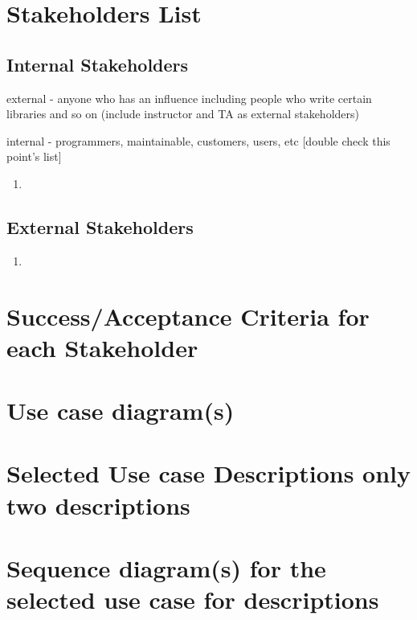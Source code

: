 \documentclass[11pt]{article}
\begin{document}
    \chapter{Stakeholders List}\label{ch:stakeholders-list}


    \section{Internal Stakeholders}\label{sec:internal-stakeholders}

    \item external - anyone who has an influence\; including people who write certain libraries and so on  (include instructor and TA as external stakeholders)
    \item internal - programmers, maintainable, customers, users, etc [double check this point's list]


    \begin{enumerate}
        \item
    \end{enumerate}


    \section{External Stakeholders}\label{sec:external-stakeholders}

    \begin{enumerate}
        \item
    \end{enumerate}


    \chapter{Success/Acceptance Criteria for each Stakeholder}


    \chapter{Use case diagram(s)}


    \chapter{Selected Use case Descriptions {only two descriptions}}


    \chapter{Sequence diagram(s) {for the selected use case for descriptions}}
\end{document}
